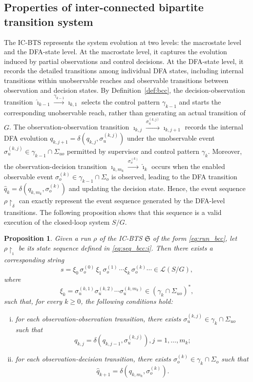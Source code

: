 \documentclass[twocolumn]{autart}
\newtheorem{mypro}{\bf Proposition}
\begin{document}
\subsection{Properties of inter-connected bipartite transition system}




The IC-BTS represents the system evolution at two levels: the macrostate level and the DFA-state level. 
At the macrostate level, it captures the evolution induced by partial observations and control decisions. 
At the DFA-state level, it records the detailed transitions among individual DFA states, including internal transitions within unobservable reaches and observable transitions between observation and decision states.
By Definition~\ref{def:bcc}, the decision-observation transition
$\hat{\imath}_{k-1} \xrightarrow{\gamma_{k-1}} \imath_{k,1}$
selects the control pattern $\gamma_{k-1}$ and starts the corresponding unobservable reach, rather than generating an actual transition of $G$.
The observation-observation transition
$\imath_{k,j} \xrightarrow{\sigma_u^{(k,j)}} \imath_{k,j+1}$
records the internal DFA evolution
$q_{k,j+1} = \delta(q_{k,j},\sigma_u^{(k,j)})$
under the unobservable event
$\sigma_u^{(k,j)} \in \gamma_{k-1}\cap\Sigma_{uo}$ permitted by supervisor and control pattern $\gamma_k$.
Moreover, the observation-decision transition
$\imath_{k,m_k} \xrightarrow{\sigma_o^{(k)}} \hat{\imath}_{k}$
occurs when the enabled observable event
$\sigma_o^{(k)}\in\gamma_{k-1}\cap\Sigma_o$
is observed, leading to the DFA transition
$\hat{q}_{k} = \delta(q_{k,m_k},\sigma_o^{(k)})$
and updating the decision state.
Hence, the event sequence $\rho\restriction_{\delta}$ can exactly represent the event sequence generated by the DFA-level transitions.
The following proposition shows that this sequence is a valid execution of the closed-loop system $S / G$.
\begin{mypro}
\label{prop:bcc_dfa_consistency}
Given a run $\rho$ of the IC-BTS $\mathfrak{S}$ of the form \eqref{eq:run_bcc}, let
$\rho\restriction_{\imath}$ be its state sequence defined in \eqref{eq:seq_bcc:i}.
Then there exists a corresponding string
$$
s = \xi_0\,\sigma_o^{(0)}\,\xi_1\,\sigma_o^{(1)}\,\cdots\xi_k\,\sigma_o^{(k)}\cdots\in \mathcal{L}(S/G),
$$
where
$$
\xi_k = \sigma_u^{(k,1)}\sigma_u^{(k,2)}\cdots\sigma_u^{(k,m_k)}\in(\gamma_k\cap\Sigma_{uo})^*,
$$
such that, for every $k\geq 0$, the following conditions hold:
\begin{enumerate}[(i)]
    \item for each observation-observation transition, there exists
    $\sigma_u^{(k,j)} \in \gamma_k\cap\Sigma_{uo}$ such that
    $$
        q_{k,j} = \delta(q_{k,j-1},\sigma_u^{(k,j)}), j = 1, \ldots, m_k;
    $$

    \item for each observation-decision transition, there exists
    $\sigma_o^{(k)} \in \gamma_k\cap\Sigma_o$ such that
    $$
        \hat q_{k+1} = \delta(q_{k,m_k},\sigma_o^{(k)}).
    $$
\end{enumerate}
\end{mypro}
\end{document}
